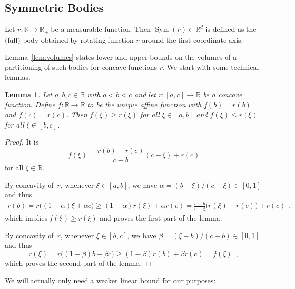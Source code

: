 \documentclass{article}
\newtheorem{lem}[thm]{Lemma}
\DeclareMathOperator{\Sym}{Sym}
\newcommand{\IR}{\mathbb{R}}
\renewcommand{\leq}{\leqslant}
\renewcommand{\geq}{\geqslant}
\begin{document}
\subsection{Symmetric Bodies}

Let $r:\IR \to \IR_+$ be a measurable function.
Then $\Sym(r) \in \IR^d$ is defined as the (full) body obtained by rotating
function $r$ around the first coordinate axis.

Lemma~\ref{lem:volumes} states lower and upper bounds on the volumes of a partitioning
  of such bodies for concave functions $r$.
We start with some technical lemmas.

\begin{lem}\label{lem:concave:line}
Let $a,b,c \in \IR$ with $a<b<c$
and let $r : [a,c]\to \IR$ be a concave function.
Define $f:\IR \to \IR$ to be the unique affine function with $f(b) = r(b)$ and
$f(c) = r(c)$.
Then $f(\xi) \geq r(\xi)$ for all $\xi \in [a,b]$ and $f(\xi) \leq r(\xi)$ for
all $\xi \in [b,c]$.
\end{lem}
\begin{proof}
It is
\begin{equation}
f(\xi)
=
\frac{r(b)-r(c)}{c-b} (c- \xi) + r(c)
\end{equation}
for all $\xi \in \IR$.

By concavity of~$r$, whenever
$\xi \in [a, b]$,
we have
$\alpha = (b - \xi)/(c - \xi) \in [0,1]$ and thus
\begin{equation}
\begin{split}
r(b)
=
r\big((1-\alpha)\xi + \alpha c\big)
\geq
(1-\alpha)r(\xi) + \alpha r(c)
=
\frac{c-b}{c-\xi}\big(r(\xi) - r(c)\big) + r(c)
\enspace,
\end{split}
\end{equation}
which implies
$f(\xi) \geq r(\xi)$ and proves the first part of the lemma.

By concavity of~$r$, 
whenever
$\xi \in [b, c]$,
we have
$\beta = (\xi-b)/(c-b) \in [0,1]$
and thus
\begin{equation}
r(\xi)
=
r\big( (1-\beta)b + \beta c \big)
\geq
(1-\beta) r(b) + \beta r(c)
=
f(\xi)
\enspace,
\end{equation}
which proves the second part of the lemma.
\end{proof}

We will actually only need a weaker linear bound for our purposes:
\end{document}
